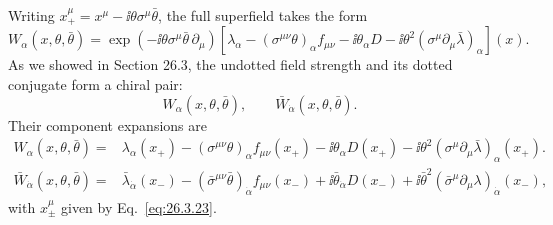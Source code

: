 Writing \(x_+^\mu=x^\mu-\ii\theta\sigma^\mu\bar\theta\), the full superfield
takes the form
\begin{equation}
  W_\alpha(x,\theta,\bar\theta)
  =\exp\!\left(-\ii\theta\sigma^\mu\bar\theta\,\partial_\mu\right)
   \left[
    \lambda_\alpha
    -(\sigma^{\mu\nu}\theta)_\alpha f_{\mu\nu}
    -\ii\theta_\alpha D
    -\ii\theta^2(\sigma^\mu\partial_\mu\bar\lambda)_\alpha
   \right](x).
  \tag{27.2.9}\label{eq:27.2.9}
\end{equation}
As we showed in Section 26.3, the undotted field strength and its dotted
conjugate form a chiral pair:
\begin{equation}
  W_\alpha(x,\theta,\bar\theta),
  \qquad
  \bar W_{\dot\alpha}(x,\theta,\bar\theta).
  \tag{27.2.10}\label{eq:27.2.10}
\end{equation}
Their component expansions are
\begin{equation}
  \begin{aligned}
  W_\alpha(x,\theta,\bar\theta)
  ={}&\lambda_\alpha(x_+)
    -(\sigma^{\mu\nu}\theta)_\alpha f_{\mu\nu}(x_+)
    -\ii\theta_\alpha D(x_+)
    -\ii\theta^2(\sigma^\mu\partial_\mu\bar\lambda)_\alpha(x_+).
  \end{aligned}
  \tag{27.2.11}\label{eq:27.2.11}
\end{equation}
\begin{equation}
  \begin{aligned}
  \bar W_{\dot\alpha}(x,\theta,\bar\theta)
  ={}&\bar\lambda_{\dot\alpha}(x_-)
    -(\bar\sigma^{\mu\nu}\bar\theta)_{\dot\alpha}
      f_{\mu\nu}(x_-)
    +\ii\bar\theta_{\dot\alpha}D(x_-)
    +\ii\bar\theta^2
      (\bar\sigma^\mu\partial_\mu\lambda)_{\dot\alpha}(x_-),
  \end{aligned}
  \tag{27.2.12}\label{eq:27.2.12}
\end{equation}
with \(x_\pm^\mu\) given by Eq.~\eqref{eq:26.3.23}.

